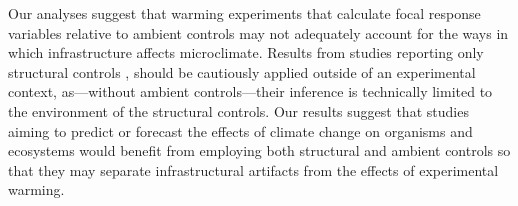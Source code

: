 \documentclass{article}
\begin{document}
\par Our analyses suggest that warming experiments that calculate focal response variables relative to ambient controls \citep[e.g.,][]{price1998,dunne2003,cleland2006,morin2010,marchin2015} may not adequately account for the ways in which infrastructure affects microclimate. Results from studies reporting only structural controls \citep [e.g.,][]{sherry2007,hoeppner2012, rollinson2012}, should be cautiously applied outside of an experimental context, as---without ambient controls---their inference is technically limited to the environment of the structural controls. Our results suggest that studies aiming to predict or forecast the effects of climate change on organisms and ecosystems would benefit from employing both structural and ambient controls so that they may separate infrastructural artifacts from the effects of experimental warming. 
\end{document}
